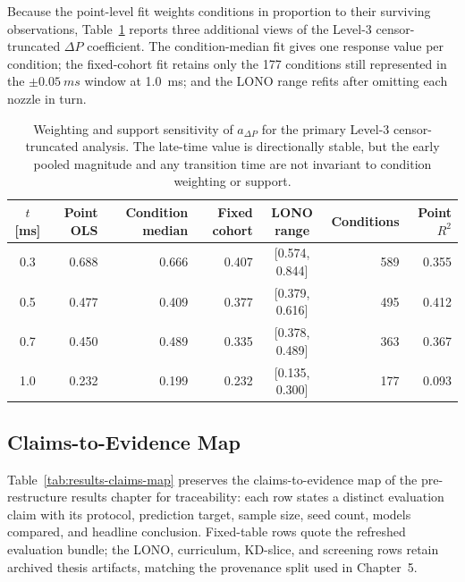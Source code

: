 Because the point-level fit weights conditions in proportion to their surviving
observations, Table~\ref{tab:time-scaling-weighting-sensitivity} reports three
additional views of the Level-3 censor-truncated \(\Delta P\) coefficient. The
condition-median fit gives one response value per condition; the fixed-cohort
fit retains only the 177 conditions still represented in the
\(\pm\SI{0.05}{ms}\) window at \SI{1.0}{ms}; and the LONO range refits after
omitting each nozzle in turn.

\begin{table}[!ht]
\centering
\footnotesize
\setlength{\tabcolsep}{4pt}
\begin{tabular}{@{}crrrcrr@{}}
\toprule
$t$ [ms] & Point OLS & Condition median & Fixed cohort & LONO range & Conditions & Point $R^2$ \\
\midrule
0.3 & 0.688 & 0.666 & 0.407 & [0.574, 0.844] & 589 & 0.355 \\
0.5 & 0.477 & 0.409 & 0.377 & [0.379, 0.616] & 495 & 0.412 \\
0.7 & 0.450 & 0.489 & 0.335 & [0.378, 0.489] & 363 & 0.367 \\
1.0 & 0.232 & 0.199 & 0.232 & [0.135, 0.300] & 177 & 0.093 \\
\bottomrule
\end{tabular}
\caption{Weighting and support sensitivity of \(a_{\Delta P}\) for the primary
Level-3 censor-truncated analysis. The late-time value is directionally stable,
but the early pooled magnitude and any transition time are not invariant to
condition weighting or support.}
\label{tab:time-scaling-weighting-sensitivity}
\end{table}

\FloatBarrier

\subsection{Claims-to-Evidence Map}

Table~\ref{tab:results-claims-map} preserves the claims-to-evidence map of the
pre-restructure results chapter for traceability: each row states a distinct
evaluation claim with its protocol, prediction target, sample size, seed count,
models compared, and headline conclusion. Fixed-table rows quote the refreshed
evaluation bundle; the LONO, curriculum, KD-slice, and screening rows retain
archived thesis artifacts, matching the provenance split used in Chapter~5.

